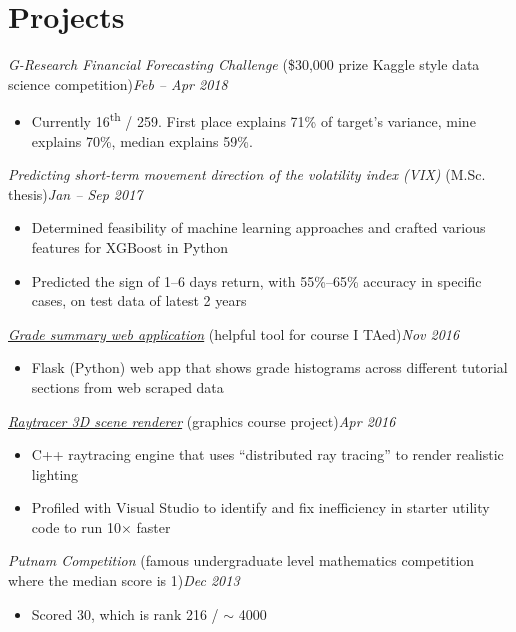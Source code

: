 \documentclass[10pt,letterpaper]{article}
\newcommand*\position[1]{\textit{#1}}
\newcommand*\timespan\position
\begin{document}
\section*{Projects}
\position{G-Research Financial Forecasting Challenge} (\$30,000 prize Kaggle style data science competition)\hfill\timespan{Feb -- Apr 2018}
\begin{itemize}
\item Currently 16\textsuperscript{th} / 259. First place explains 71\% of target's variance, mine explains 70\%, median explains 59\%.
\end{itemize}
\position{Predicting short-term movement direction of the volatility index (VIX)} (M.Sc. thesis)\hfill\timespan{Jan -- Sep 2017}
\begin{itemize}
\item Determined feasibility of machine learning approaches and crafted various features for XGBoost in Python
\item Predicted the sign of 1--6 days return, with 55\%--65\% accuracy in specific cases, on test data of latest 2 years
\end{itemize}
\position{\href{https://github.com/yumichael/blackboardlearn-statsview}{Grade summary web application}} (helpful tool for course I TAed)\hfill\timespan{Nov 2016}
\begin{itemize}
\item Flask (Python) web app that shows grade histograms across different tutorial sections from web scraped data
\end{itemize}
\position{\href{https://github.com/yumichael/raytrace}{Raytracer 3D scene renderer}} (graphics course project)\hfill\timespan{Apr 2016}
\begin{itemize}
\item C++ raytracing engine that uses ``distributed ray tracing'' to render realistic lighting
\item Profiled with Visual Studio to identify and fix inefficiency in starter utility code to run 10\(\times\) faster
\end{itemize}
\position{Putnam Competition} (famous undergraduate level mathematics competition where the median score is 1)\hfill\timespan{Dec 2013}
\begin{itemize}
\item Scored 30, which is rank 216 / \(\sim\) 4000
\end{itemize}
\end{document}
